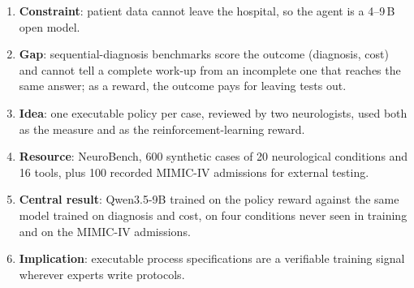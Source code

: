 \structure
\begin{enumerate}
\item \textbf{Constraint}: patient data cannot leave the hospital, so the agent is a 4--9\,B open model.
\item \textbf{Gap}: sequential-diagnosis benchmarks score the outcome (diagnosis, cost) and cannot tell a
complete work-up from an incomplete one that reaches the same answer; as a reward, the outcome pays
for leaving tests out.
\item \textbf{Idea}: one executable policy per case, reviewed by two neurologists, used both as the
measure and as the reinforcement-learning reward.
\item \textbf{Resource}: NeuroBench, 600 synthetic cases of 20 neurological conditions and 16 tools,
plus 100 recorded MIMIC-IV admissions for external testing.
\item \textbf{Central result}: Qwen3.5-9B trained on the policy reward against the same model trained on
diagnosis and cost, on four conditions never seen in training and on the MIMIC-IV admissions.
\item \textbf{Implication}: executable process specifications are a verifiable training signal wherever
experts write protocols.
\end{enumerate}

